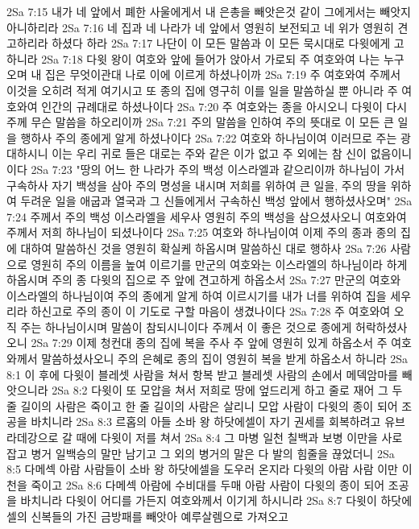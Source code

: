 2Sa 7:15  내가 네 앞에서 폐한 사울에게서 내 은총을 빼앗은것 같이 그에게서는 빼앗지 아니하리라
2Sa 7:16  네 집과 네 나라가 네 앞에서 영원히 보전되고 네 위가 영원히 견고하리라 하셨다 하라
2Sa 7:17  나단이 이 모든 말씀과 이 모든 묵시대로 다윗에게 고하니라
2Sa 7:18  다윗 왕이 여호와 앞에 들어가 앉아서 가로되 주 여호와여 나는 누구오며 내 집은 무엇이관대 나로 이에 이르게 하셨나이까
2Sa 7:19  주 여호와여 주께서 이것을 오히려 적게 여기시고 또 종의 집에 영구히 이를 일을 말씀하실 뿐 아니라 주 여호와여 인간의 규례대로 하셨나이다
2Sa 7:20  주 여호와는 종을 아시오니 다윗이 다시 주께 무슨 말씀을 하오리이까
2Sa 7:21  주의 말씀을 인하여 주의 뜻대로 이 모든 큰 일을 행하사 주의 종에게 알게 하셨나이다
2Sa 7:22  여호와 하나님이여 이러므로 주는 광대하시니 이는 우리 귀로 들은 대로는 주와 같은 이가 없고 주 외에는 참 신이 없음이니이다
2Sa 7:23  "땅의 어느 한 나라가 주의 백성 이스라엘과 같으리이까 하나님이 가서 구속하사 자기 백성을 삼아 주의 명성을 내시며 저희를 위하여 큰 일을, 주의 땅을 위하여 두려운 일을 애굽과 열국과 그 신들에게서 구속하신 백성 앞에서 행하셨사오며"
2Sa 7:24  주께서 주의 백성 이스라엘을 세우사 영원히 주의 백성을 삼으셨사오니 여호와여 주께서 저희 하나님이 되셨나이다
2Sa 7:25  여호와 하나님이여 이제 주의 종과 종의 집에 대하여 말씀하신 것을 영원히 확실케 하옵시며 말씀하신 대로 행하사
2Sa 7:26  사람으로 영원히 주의 이름을 높여 이르기를 만군의 여호와는 이스라엘의 하나님이라 하게 하옵시며 주의 종 다윗의 집으로 주 앞에 견고하게 하옵소서
2Sa 7:27  만군의 여호와 이스라엘의 하나님이여 주의 종에게 알게 하여 이르시기를 내가 너를 위하여 집을 세우리라 하신고로 주의 종이 이 기도로 구할 마음이 생겼나이다
2Sa 7:28  주 여호와여 오직 주는 하나님이시며 말씀이 참되시니이다 주께서 이 좋은 것으로 종에게 허락하셨사오니
2Sa 7:29  이제 청컨대 종의 집에 복을 주사 주 앞에 영원히 있게 하옵소서 주 여호와께서 말씀하셨사오니 주의 은혜로 종의 집이 영원히 복을 받게 하옵소서 하니라
2Sa 8:1  이 후에 다윗이 블레셋 사람을 쳐서 항복 받고 블레셋 사람의 손에서 메덱암마를 빼앗으니라
2Sa 8:2  다윗이 또 모압을 쳐서 저희로 땅에 엎드리게 하고 줄로 재어 그 두 줄 길이의 사람은 죽이고 한 줄 길이의 사람은 살리니 모압 사람이 다윗의 종이 되어 조공을 바치니라
2Sa 8:3  르홉의 아들 소바 왕 하닷에셀이 자기 권세를 회복하려고 유브라데강으로 갈 때에 다윗이 저를 쳐서
2Sa 8:4  그 마병 일천 칠백과 보병 이만을 사로잡고 병거 일백승의 말만 남기고 그 외의 병거의 말은 다 발의 힘줄을 끊었더니
2Sa 8:5  다메섹 아람 사람들이 소바 왕 하닷에셀을 도우러 온지라 다윗의 아람 사람 이만 이천을 죽이고
2Sa 8:6  다메섹 아람에 수비대를 두매 아람 사람이 다윗의 종이 되어 조공을 바치니라 다윗이 어디를 가든지 여호와께서 이기게 하시니라
2Sa 8:7  다윗이 하닷에셀의 신복들의 가진 금방패를 빼앗아 예루살렘으로 가져오고
